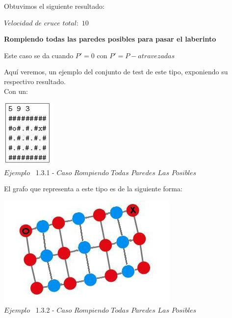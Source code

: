   Obtuvimos el siguiente resultado:

$Velocidad$ $de$ $cruce$ $total: $ $10$


\begin{center}
 \textbf{Rompiendo todas las paredes posibles para pasar el laberinto}
\end{center}

Este caso se da cuando $P' = 0$ con $P' = P - atravezadas$ 

Aqu\'i veremos, un ejemplo del conjunto de test de este tipo, exponiendo su respectivo resultado.\\
 
 Con un:
 
\vspace*{0.3cm} \vspace*{0.3cm}
  \begin{center}
 \includegraphics[scale=0.65]{./EJ1/ej1rompertodasparedes.jpeg}
\\ {$Ejemplo$ \ 1.3.1 - $Caso$ $Rompiendo$ $Todas$ $Paredes$ $Las$ $Posibles$}
  \end{center}
  \vspace*{0.3cm}

El grafo que representa a este tipo es de la siguiente forma:\\

\vspace*{0.3cm} \vspace*{0.3cm}
  \begin{center}
 \includegraphics[scale=0.5]{./EJ1/ej1grafosolucionconpared.jpeg}
 \\{$Ejemplo$ \ 1.3.2 - $Caso$ $Rompiendo$ $Todas$ $Paredes$ $Las$ $Posibles$}
  \end{center}
  \vspace*{0.3cm}

